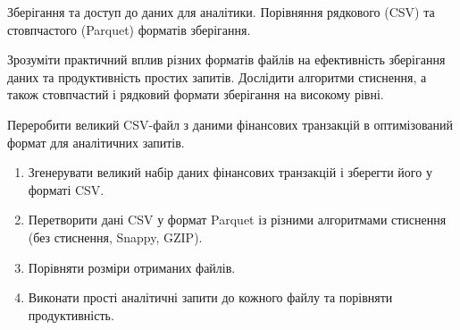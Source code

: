 


 Зберігання та доступ до даних для аналітики. Порівняння рядкового (CSV) та стовпчастого (Parquet) форматів зберігання.

 Зрозуміти практичний вплив різних форматів файлів на ефективність зберігання даних та продуктивність простих запитів. Дослідити алгоритми стиснення, а також стовпчастий і рядковий формати зберігання на високому рівні.

 Переробити великий CSV-файл з даними фінансових транзакцій в оптимізований формат для аналітичних запитів.

\begin{enumerate}
  \item Згенерувати великий набір даних фінансових транзакцій і зберегти його у форматі CSV.
  \item Перетворити дані CSV у формат Parquet із різними алгоритмами стиснення (без стиснення, Snappy, GZIP).
  \item Порівняти розміри отриманих файлів.
  \item Виконати прості аналітичні запити до кожного файлу та порівняти продуктивність.
\end{enumerate}

